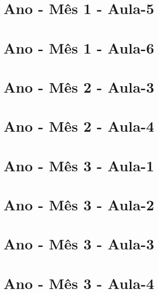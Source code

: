 \begin{multicols}{2}
\section[\sffamily 1\textordmasculine\space Ano - Mês 1 - Aula-5]{\textordmasculine\space Ano - Mês 1 - Aula-5}


\section[\sffamily 1\textordmasculine\space Ano - Mês 1 - Aula-6]{\textordmasculine\space Ano - Mês 1 - Aula-6}


\section[\sffamily 1\textordmasculine\space Ano - Mês 2 - Aula-3]{\textordmasculine\space Ano - Mês 2 - Aula-3}


\section[\sffamily 1\textordmasculine\space Ano - Mês 2 - Aula-4]{\textordmasculine\space Ano - Mês 2 - Aula-4}


\section[\sffamily 1\textordmasculine\space Ano - Mês 3 - Aula-1]{\textordmasculine\space Ano - Mês 3 - Aula-1}


\section[\sffamily 1\textordmasculine\space Ano - Mês 3 - Aula-2]{\textordmasculine\space Ano - Mês 3 - Aula-2}


\section[\sffamily 1\textordmasculine\space Ano - Mês 3 - Aula-3]{\textordmasculine\space Ano - Mês 3 - Aula-3}


\section[\sffamily 1\textordmasculine\space Ano - Mês 3 - Aula-4]{\textordmasculine\space Ano - Mês 3 - Aula-4}



\end{multicols}
